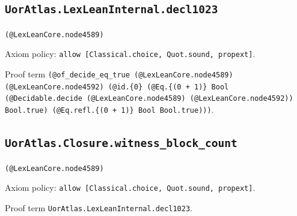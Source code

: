 \documentclass[11pt]{article}
\begin{document}
\subsection*{\texttt{UorAtlas.LexLeanInternal.decl1023}}
\noindent\texttt{(@LexLeanCore.node4589)}\par
\noindent Axiom policy: \texttt{allow [Classical.choice, Quot.sound, propext]}.\par
\noindent Proof term \texttt{(@of\_decide\_eq\_true (@LexLeanCore.node4589) (@LexLeanCore.node4592) (@id.\{0\} (@Eq.\{(0 + 1)\} Bool (@Decidable.decide (@LexLeanCore.node4589) (@LexLeanCore.node4592)) Bool.true) (@Eq.refl.\{(0 + 1)\} Bool Bool.true)))}.\par
\subsection*{\texttt{UorAtlas.Closure.witness\_block\_count}}
\noindent\texttt{(@LexLeanCore.node4589)}\par
\noindent Axiom policy: \texttt{allow [Classical.choice, Quot.sound, propext]}.\par
\noindent Proof term \texttt{UorAtlas.LexLeanInternal.decl1023}.\par
\end{document}
